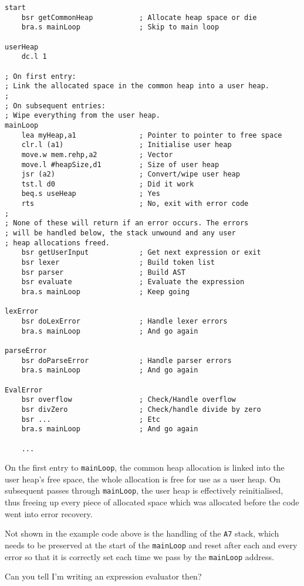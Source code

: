\begin{lstlisting}[caption={User Heap Total Deallocation},label={lis:User-Heap-Total-Deallocation}]
start
    bsr getCommonHeap           ; Allocate heap space or die
    bra.s mainLoop              ; Skip to main loop

userHeap 
    dc.l 1

; On first entry:
; Link the allocated space in the common heap into a user heap.
;
; On subsequent entries:
; Wipe everything from the user heap.
mainLoop
    lea myHeap,a1               ; Pointer to pointer to free space
    clr.l (a1)                  ; Initialise user heap
    move.w mem.rehp,a2          ; Vector 
    move.l #heapSize,d1         ; Size of user heap
    jsr (a2)                    ; Convert/wipe user heap
    tst.l d0                    ; Did it work
    beq.s useHeap               ; Yes
    rts                         ; No, exit with error code
;
; None of these will return if an error occurs. The errors
; will be handled below, the stack unwound and any user
; heap allocations freed.
    bsr getUserInput            ; Get next expression or exit
    bsr lexer                   ; Build token list
    bsr parser                  ; Build AST
    bsr evaluate                ; Evaluate the expression
    bra.s mainLoop              ; Keep going

lexError
    bsr doLexError              ; Handle lexer errors
    bra.s mainLoop              ; And go again

parseError
    bsr doParseError            ; Handle parser errors
    bra.s mainLoop              ; And go again

EvalError
    bsr overflow                ; Check/Handle overflow
    bsr divZero                 ; Check/handle divide by zero
    bsr ...                     ; Etc
    bra.s mainLoop              ; And go again

    ...

\end{lstlisting}

On the first entry to \texttt{mainLoop}, the common heap allocation
is linked into the user heap's free space, the whole allocation is
free for use as a user heap. On subsequent passes through \texttt{mainLoop},
the user heap is effectively reinitialised, thus freeing up every
piece of allocated space which was allocated before the code went
into error recovery.

Not shown in the example code above is the handling of the \texttt{A7}
stack, which needs to be preserved at the start of the \texttt{mainLoop}
and reset after each and every error so that it is correctly set each
time we pass by the \texttt{mainLoop} address.

Can you tell I'm writing an expression evaluator then? 
